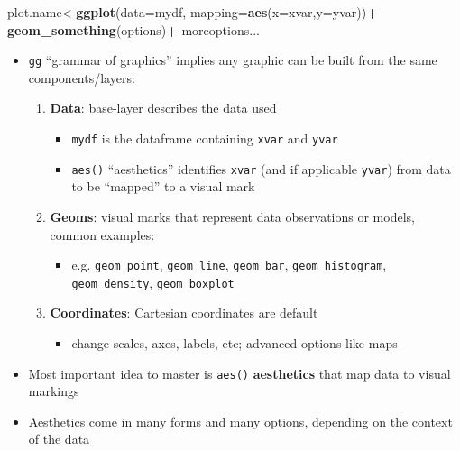 \documentclass[]{book}
\newenvironment{Shaded}{\begin{snugshade}}{\end{snugshade}}
\newcommand{\KeywordTok}[1]{\textcolor[rgb]{0.13,0.29,0.53}{\textbf{#1}}}
\newcommand{\DataTypeTok}[1]{\textcolor[rgb]{0.13,0.29,0.53}{#1}}
\newcommand{\StringTok}[1]{\textcolor[rgb]{0.31,0.60,0.02}{#1}}
\newcommand{\OperatorTok}[1]{\textcolor[rgb]{0.81,0.36,0.00}{\textbf{#1}}}
\newcommand{\NormalTok}[1]{#1}
\providecommand{\tightlist}{%
  \setlength{\itemsep}{0pt}\setlength{\parskip}{0pt}}
\theoremstyle{definition}
\theoremstyle{definition}
\theoremstyle{definition}
\theoremstyle{remark}
\begin{document}
\begin{Shaded}
\begin{Highlighting}[]
\NormalTok{plot.name<-}\KeywordTok{ggplot}\NormalTok{(}\DataTypeTok{data=}\NormalTok{mydf, }\DataTypeTok{mapping=}\KeywordTok{aes}\NormalTok{(}\DataTypeTok{x=}\NormalTok{xvar,}\DataTypeTok{y=}\NormalTok{yvar))}\OperatorTok{+}
\StringTok{  }\KeywordTok{geom_something}\NormalTok{(options)}\OperatorTok{+}
\StringTok{  }\NormalTok{moreoptions...}
\end{Highlighting}
\end{Shaded}

\begin{itemize}
\tightlist
\item
  \texttt{gg} ``grammar of graphics'' implies any graphic can be built
  from the same components/layers:

  \begin{enumerate}
  \def\labelenumi{\arabic{enumi}.}
  \tightlist
  \item
    \textbf{Data}: base-layer describes the data used

    \begin{itemize}
    \tightlist
    \item
      \texttt{mydf} is the dataframe containing \texttt{xvar} and
      \texttt{yvar}
    \item
      \texttt{aes()} ``aesthetics'' identifies \texttt{xvar} (and if
      applicable \texttt{yvar}) from data to be ``mapped'' to a visual
      mark
    \end{itemize}
  \item
    \textbf{Geoms}: visual marks that represent data observations or
    models, common examples:

    \begin{itemize}
    \tightlist
    \item
      e.g. \texttt{geom\_point}, \texttt{geom\_line},
      \texttt{geom\_bar}, \texttt{geom\_histogram},
      \texttt{geom\_density}, \texttt{geom\_boxplot}
    \end{itemize}
  \item
    \textbf{Coordinates}: Cartesian coordinates are default

    \begin{itemize}
    \tightlist
    \item
      change scales, axes, labels, etc; advanced options like maps
    \end{itemize}
  \end{enumerate}
\item
  Most important idea to master is \texttt{aes()} \textbf{aesthetics}
  that map data to visual markings
\item
  Aesthetics come in many forms and many options, depending on the
  context of the data


\end{itemize}
\end{document}
